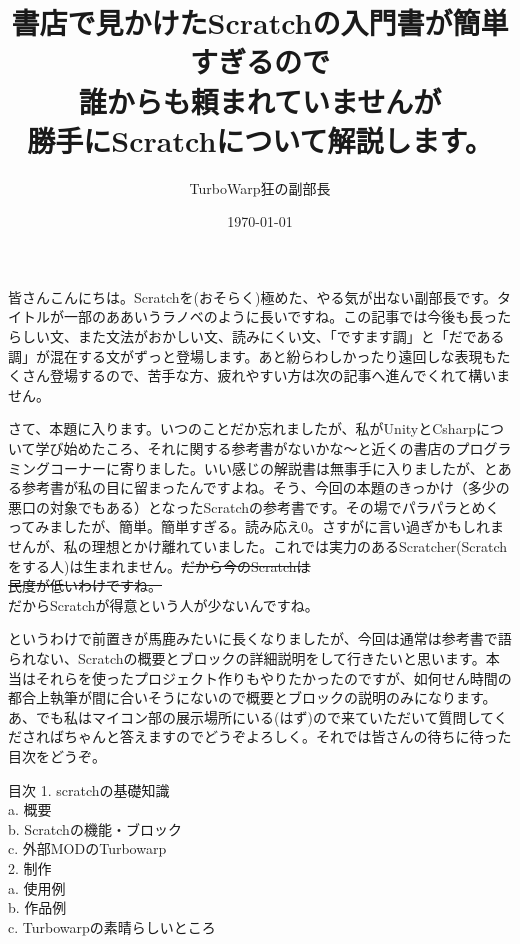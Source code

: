 \documentclass[b5paper,10pt]{jsarticle}
\begin{document}
\title{書店で見かけたScratchの入門書が簡単すぎるので\\誰からも頼まれていませんが\\勝手にScratchについて解説します。}
\author{TurboWarp狂の副部長}
\date{\today}
\maketitle
\thispagestyle{empty}

\begin{multicols*}{3}
  
皆さんこんにちは。Scratchを(おそらく)極めた、やる気が出ない副部長です。タイトルが一部のああいうラノベのように長いですね。この記事では今後も長ったらしい文、また文法がおかしい文、読みにくい文、「ですます調」と「だである調」が混在する文がずっと登場します。あと紛らわしかったり遠回しな表現もたくさん登場するので、苦手な方、疲れやすい方は次の記事へ進んでくれて構いません。

さて、本題に入ります。いつのことだか忘れましたが、私がUnityとCsharpについて学び始めたころ、それに関する参考書がないかな～と近くの書店のプログラミングコーナーに寄りました。いい感じの解説書は無事手に入りましたが、とある参考書が私の目に留まったんですよね。そう、今回の本題のきっかけ（多少の悪口の対象でもある）となったScratchの参考書です。その場でパラパラとめくってみましたが、簡単。簡単すぎる。読み応え0。さすがに言い過ぎかもしれませんが、私の理想とかけ離れていました。これでは実力のあるScratcher(Scratchをする人)は生まれません。\sout{だから今のScratchは\\民度が低いわけですね。}\\だからScratchが得意という人が少ないんですね。

というわけで前置きが馬鹿みたいに長くなりましたが、今回は通常は参考書で語られない、Scratchの概要とブロックの詳細説明をして行きたいと思います。本当はそれらを使ったプロジェクト作りもやりたかったのですが、如何せん時間の都合上執筆が間に合いそうにないので概要とブロックの説明のみになります。あ、でも私はマイコン部の展示場所にいる(はず)ので来ていただいて質問してくださればちゃんと答えますのでどうぞよろしく。それでは皆さんの待ちに待った目次をどうぞ。

\begin{itembox}{目次}
{1. }scratchの基礎知識\\
{ a. }概要\\
{ b. }Scratchの機能・ブロック\\
{ c. }外部MODのTurbowarp\\
{2. }制作\\
{ a. }使用例\\
{ b. }作品例\\
{ c. }Turbowarpの素晴らしいところ
\end{itembox}


\end{multicols*}
\end{document}
